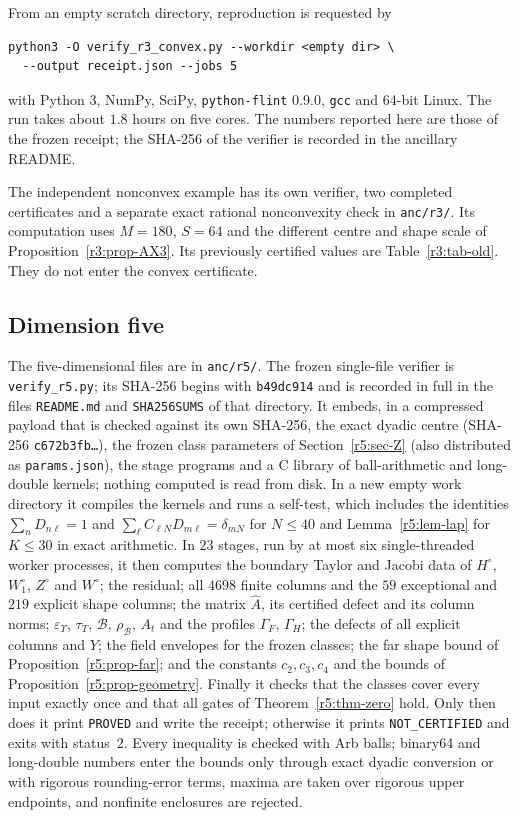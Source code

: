 \documentclass[11pt]{amsart}
\theoremstyle{definition}
\theoremstyle{remark}
\numberwithin{equation}{section}
\newcommand{\eps}{\varepsilon}
\begin{document}
From an empty scratch directory, reproduction is requested by
\begin{verbatim}
python3 -O verify_r3_convex.py --workdir <empty dir> \
  --output receipt.json --jobs 5
\end{verbatim}
with Python 3, NumPy, SciPy, \texttt{python-flint} 0.9.0, \texttt{gcc} and 64-bit Linux. The run takes about $1.8$ hours on five cores. The numbers reported here are those of the frozen receipt; the SHA-256 of the verifier is recorded in the ancillary README.

The independent nonconvex example has its own verifier, two completed certificates and a separate exact rational nonconvexity check in \texttt{anc/r3/}. Its computation uses $M=180$, $S=64$ and the different centre and shape scale of Proposition~\ref{r3:prop-AX3}. Its previously certified values are Table~\ref{r3:tab-old}. They do not enter the convex certificate.

\subsection{Dimension five}\label{r5:sec-cap}
{\sloppy The five-dimensional files are in \texttt{anc/r5/}. The frozen single-file verifier is \texttt{verify\_r5.py}; its SHA-256 begins with \texttt{b49dc914} and is recorded in full in the files \texttt{README.md} and \texttt{SHA256SUMS} of that directory. It embeds, in a compressed payload that is checked against its own SHA-256, the exact dyadic centre (SHA-256 \texttt{c672b3fb\ldots}), the frozen class parameters of Section~\ref{r5:sec-Z} (also distributed as \texttt{params.json}), the stage programs and a C library of ball-arithmetic and long-double kernels; nothing computed is read from disk. In a new empty work directory it compiles the kernels and runs a self-test, which includes the identities $\sum_nD_{n\ell}=1$ and $\sum_\ell C_{\ell N}D_{m\ell}=\delta_{mN}$ for $N\leq40$ and Lemma~\ref{r5:lem-lap} for $K\leq30$ in exact arithmetic. In $23$ stages, run by at most six single-threaded worker processes, it then computes the boundary Taylor and Jacobi data of $H^\circ$, $W^\circ_1$, $Z^\circ$ and $W^\circ$; the residual; all $4698$ finite columns and the $59$ exceptional and $219$ explicit shape columns; the matrix $\widehat A$, its certified defect and its column norms; $\eps_\Upsilon$, $\tau_T$, $\mathcal B$, $\rho_{\mathcal B}$, $A_t$ and the profiles $\Gamma_F$, $\Gamma_H$; the defects of all explicit columns and $Y$; the field envelopes for the frozen classes; the far shape bound of Proposition~\ref{r5:prop-far}; and the constants $c_2,c_3,c_4$ and the bounds of Proposition~\ref{r5:prop-geometry}. Finally it checks that the classes cover every input exactly once and that all gates of Theorem~\ref{r5:thm-zero} hold. Only then does it print \texttt{PROVED} and write the receipt; otherwise it prints \texttt{NOT\_CERTIFIED} and exits with status~$2$. Every inequality is checked with Arb balls; binary64 and long-double numbers enter the bounds only through exact dyadic conversion or with rigorous rounding-error terms, maxima are taken over rigorous upper endpoints, and nonfinite enclosures are rejected.\par}
\end{document}
